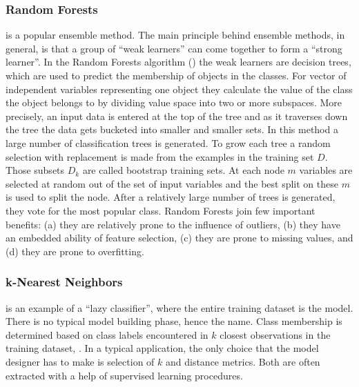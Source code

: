 \documentclass{llncs}
\begin{document}
\vspace{-9pt}
\subsubsection{Random Forests}

is a popular ensemble method. The main principle behind ensemble methods, in general, is that a group of ``weak learners'' can come together to form a ``strong learner''. In the Random Forests algorithm (\cite{Breiman2001}) the weak learners are decision trees, which are used to predict the membership of objects in the classes. For vector of independent variables representing one object they calculate the value of the class the object belongs to by dividing value space into two or more subspaces. More precisely, an input data is entered at the top of the tree and as it traverses down the tree the data gets bucketed into smaller and smaller sets. In this method a large number of classification trees is generated. To grow each tree a random selection with replacement is made from the examples in the training set $D$. Those subsets $D_{k}$ are called bootstrap training sets. At each node $m$ variables are selected at random out of the set of input variables and the best split on these $m$ is used to split the node. After a relatively large number of trees is generated, they vote for the most popular class. Random Forests join few important benefits: (a) they are relatively prone to the influence of outliers, (b) they have an embedded ability of feature selection, (c) they are prone to missing values, and (d) they are prone to overfitting. 

\vspace{-9pt}
\subsubsection{k-Nearest Neighbors}

is an example of a ``lazy classifier'', where the entire training dataset is the model. There is no typical model building phase, hence the name. Class membership is determined based on class labels encountered in $k$ closest observations in the training dataset, \cite{Altman1992}. In a typical application, the only choice that the model designer has to make is selection of $k$ and distance metrics. Both are often extracted with a help of  supervised learning procedures.
\end{document}
